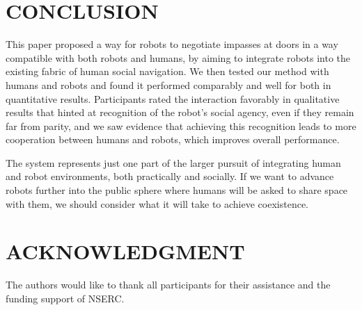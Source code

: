 \documentclass[letterpaper, 10 pt, conference]{ieeeconf}  %
\begin{document}
\section{CONCLUSION}

This paper proposed a way for robots to negotiate impasses at doors in a way compatible with both robots and humans, by aiming to integrate robots into the existing fabric of human social navigation. We then tested our method with humans and robots and found it performed comparably and well for both in quantitative results. Participants rated the interaction favorably in qualitative results that hinted at recognition of the robot’s social agency, even if they remain far from parity, and we saw evidence that achieving this recognition leads to more cooperation between humans and robots, which improves overall performance.

The system represents just one part of the larger pursuit of integrating human and robot environments, both practically and socially. If we want to advance robots further into the public sphere where humans will be asked to share space with them, we should consider what it will take to achieve coexistence.

\section*{ACKNOWLEDGMENT}

The authors would like to thank all participants for their assistance and the funding support of NSERC.
\end{document}

